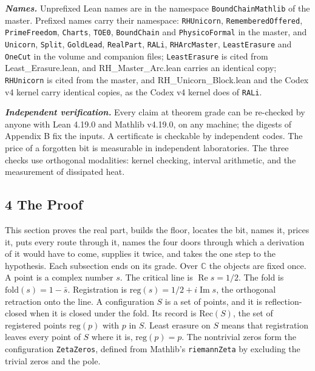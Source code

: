 \documentclass[10pt]{article}
\begin{document}
\textbf{\emph{Names.}} Unprefixed Lean names are in the namespace
\texttt{BoundChainMathlib} of the master. Prefixed names carry their
namespace: \texttt{RHUnicorn}, \texttt{RememberedOffered},
\texttt{PrimeFreedom}, \texttt{Charts}, \texttt{TOE0},
\texttt{BoundChain} and \texttt{PhysicoFormal} in the master, and
\texttt{Unicorn}, \texttt{Split}, \texttt{GoldLead}, \texttt{RealPart},
\texttt{RALi}, \texttt{RHArcMaster}, \texttt{LeastErasure} and
\texttt{OneCut} in the volume and companion files; \texttt{LeastErasure}
is cited from Least\_Erasure.lean, and RH\_Master\_Arc.lean carries an
identical copy; \texttt{RHUnicorn} is cited from the master, and
RH\_Unicorn\_Block.lean and the Codex v4 kernel carry identical copies,
as the Codex v4 kernel does of \texttt{RALi}.

\textbf{\emph{Independent verification.}} Every claim at theorem grade
can be re-checked by anyone with Lean 4.19.0 and Mathlib v4.19.0, on any
machine; the digests of Appendix B fix the inputs. A certificate is
checkable by independent codes. The price of a forgotten bit is
measurable in independent laboratories. The three checks use orthogonal
modalities: kernel checking, interval arithmetic, and the measurement of
dissipated heat.

\hypertarget{the-proof}{%
\subsection{4 The Proof}\label{the-proof}}

This section proves the real part, builds the floor, locates the bit,
names it, prices it, puts every route through it, names the four doors
through which a derivation of it would have to come, supplies it twice,
and takes the one step to the hypothesis. Each subsection ends on its
grade. Over \(\mathbb{C}\) the objects are fixed once. A point is a
complex number \(s\). The critical line is
\(\operatorname{Re} s = 1/2\). The fold is
\(\mathrm{fold}(s) = 1 - \bar{s}\). Registration is
\(\mathrm{reg}(s) = 1/2 + i\operatorname{Im} s\), the orthogonal
retraction onto the line. A configuration \(S\) is a set of points, and
it is reflection-closed when it is closed under the fold. Its record is
\(\mathrm{Rec}(S)\), the set of registered points \(\mathrm{reg}(p)\)
with \(p\) in \(S\). Least erasure on \(S\) means that registration
leaves every point of \(S\) where it is, \(\mathrm{reg}(p) = p\). The
nontrivial zeros form the configuration \texttt{ZetaZeros}, defined from
Mathlib's \texttt{riemannZeta} by excluding the trivial zeros and the
pole.
\end{document}
